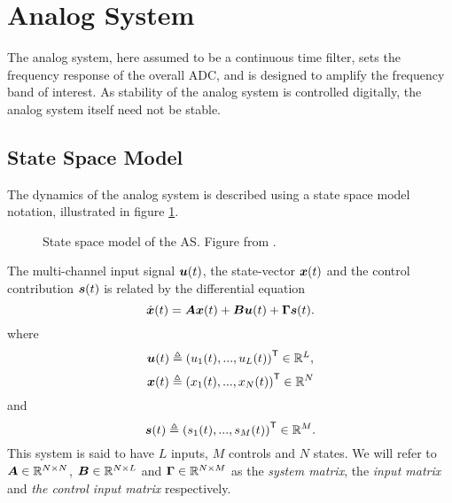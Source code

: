\section{Analog System}
\label{subsec:analog_system}
The analog system, here assumed to be a continuous time filter, sets the frequency response of the overall ADC, and is designed to amplify the frequency band of interest. As stability of the analog system is controlled digitally, the analog system itself need not be stable.

\subsection{State Space Model}
The dynamics of the analog system is described using a state space model notation, illustrated in figure \ref{fig:as_state_space_model}.
\begin{figure}[htbp]
    
    \centering
    \caption{State space model of the AS. Figure from \cite{malmberg_thesis}.}
    \label{fig:as_state_space_model}
\end{figure}
The multi-channel input signal $\bm{u}(t)$, the state-vector $\bm{x}(t)$ and the control contribution $\bm{s}(t)$ is related by the differential equation
\begin{equation}
    \label{eq:state_space_equations}
    \dot{\bm{x}}(t) = \bm{A}\bm{x}(t) + \bm{B}\bm{u}(t) + \bm{\Gamma}\bm{s}(t).
\end{equation}
where
\begin{equation}
    \label{eq:def_input_sig}
    \bm{u}(t) \triangleq \left( u_1(t),..., u_L(t) \right)^\mathsf{T} \in \mathbb{R}^L,
\end{equation}
\begin{equation}
    \label{eq:def_state_vector}
    \bm{x}(t) \triangleq \left( x_1(t),..., x_N(t) \right)^\mathsf{T} \in \mathbb{R}^N
\end{equation}
and
\begin{equation}
    \label{eq:def_control_contribution}
    \bm{s}(t) \triangleq \left( s_1(t),..., s_M(t) \right)^\mathsf{T} \in \mathbb{R}^M.
\end{equation}
This system is said to have $L$ inputs, $M$ controls and $N$ states. We will refer to $\bm{A} \in \mathbb{R}^{N \times N}$, $\bm{B} \in \mathbb{R}^{N \times L}$ and $\bm{\Gamma} \in \mathbb{R}^{N \times M}$ as the \textit{system matrix}, the \textit{input matrix} and \textit{the control input matrix} respectively.

